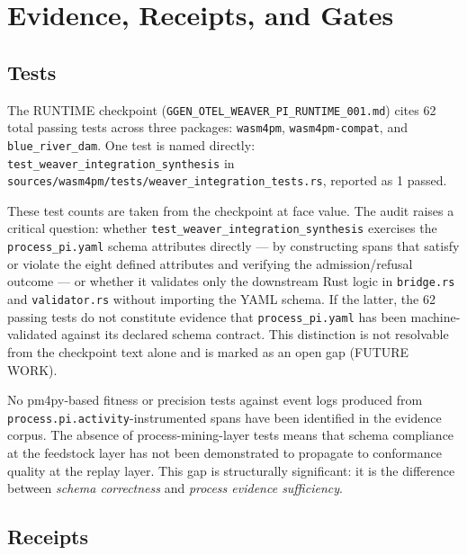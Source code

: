 
\section{Evidence, Receipts, and Gates}
\label{sec:otel-weaver-exp-001-custom-pi-registry-evidence}

\subsection{Tests}
\label{sec:otel-weaver-exp-001-custom-pi-registry-evidence-tests}

The RUNTIME checkpoint (\texttt{GGEN\_OTEL\_WEAVER\_PI\_RUNTIME\_001.md}) cites 62 total passing
tests across three packages: \texttt{wasm4pm}, \texttt{wasm4pm-compat}, and
\texttt{blue\_river\_dam}. One test is named directly:
\texttt{test\_weaver\_integration\_synthesis} in
\texttt{sources/wasm4pm/tests/weaver\_integration\_tests.rs}, reported as 1 passed.

These test counts are taken from the checkpoint at face value. The audit raises a critical question:
whether \texttt{test\_weaver\_integration\_synthesis} exercises the \texttt{process\_pi.yaml}
schema attributes directly --- by constructing spans that satisfy or violate the eight defined
attributes and verifying the admission/refusal outcome --- or whether it validates only the
downstream Rust logic in \texttt{bridge.rs} and \texttt{validator.rs} without importing the YAML
schema. If the latter, the 62 passing tests do not constitute evidence that
\texttt{process\_pi.yaml} has been machine-validated against its declared schema contract. This
distinction is not resolvable from the checkpoint text alone and is marked as an open gap
(FUTURE WORK).

No pm4py-based fitness or precision tests against event logs produced from
\texttt{process.pi.activity}-instrumented spans have been identified in the evidence corpus.
The absence of process-mining-layer tests means that schema compliance at the feedstock layer has
not been demonstrated to propagate to conformance quality at the replay layer. This gap is
structurally significant: it is the difference between \emph{schema correctness} and
\emph{process evidence sufficiency}.

\subsection{Receipts}
\label{sec:otel-weaver-exp-001-custom-pi-registry-evidence-receipts}

